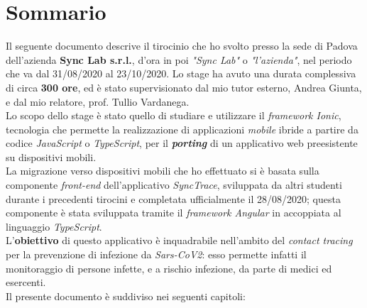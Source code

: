 
\cleardoublepage
{}
{}
\begingroup
\let\clearpage\relax
\let\cleardoublepage\relax
\let\cleardoublepage\relax

\chapter*{Sommario}

Il seguente documento descrive il tirocinio che ho svolto presso la sede di Padova dell'azienda \textbf{Sync Lab s.r.l.}, d'ora in poi \textit{"Sync Lab"} o \textit{"l'azienda"}, nel periodo che va dal 31/08/2020 al 23/10/2020. Lo stage ha avuto una durata complessiva di circa \textbf{300 ore}, ed è stato supervisionato dal mio tutor esterno, Andrea Giunta, e dal mio relatore, prof. Tullio Vardanega.\\
Lo scopo dello stage è stato quello di studiare e utilizzare il \textit{framework Ionic}, tecnologia che permette la realizzazione di applicazioni \textit{mobile} ibride a partire da codice \textit{JavaScript} o \textit{TypeScript}, per il \textbf{\textit{porting}} di un applicativo web preesistente su dispositivi mobili. \\
La migrazione verso dispositivi mobili che ho effettuato si è basata sulla componente \textit{front-end} dell'applicativo \textit{SyncTrace}, sviluppata da altri studenti durante i precedenti tirocini e completata ufficialmente il 28/08/2020; questa componente è stata sviluppata tramite il \textit{framework Angular} in accoppiata al linguaggio \textit{TypeScript}. \\
L'\textbf{obiettivo} di questo applicativo è inquadrabile nell'ambito del \textit{contact tracing} per la prevenzione di infezione da \textit{Sars-CoV2}: esso permette infatti il monitoraggio di persone infette, e a rischio infezione, da parte di medici ed esercenti.\\
Il presente documento è suddiviso nei seguenti capitoli:
